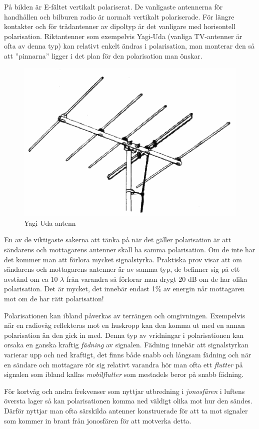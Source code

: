 På bilden är E-fältet vertikalt polariserat. De vanligaste antennerna för handhållen och bilburen radio är normalt vertikalt polariserade. För längre kontakter och för trådantenner av dipoltyp är det vanligare med horisontell polarisation. Riktantenner som exempelvis Yagi-Uda (vanliga TV-antenner är ofta av denna typ) kan relativt enkelt ändras i polarisation, man monterar den så att ''pinnarna'' ligger i det plan för den polarisation man önskar.

\begin{figure}[h]
	\centering
	\includegraphics[width=.4\textwidth]{img/yagi-uda}	
	\caption{Yagi-Uda antenn}
\end{figure}

En av de viktigaste sakerna att tänka på när det gäller polarisation är att sändarens och mottagarens antenner skall ha samma polarisation. Om de inte har det kommer man att förlora mycket signalstyrka. Praktiska prov visar att om sändarens och mottagarens antenner är av samma typ, de befinner sig på ett avstånd om ca 10 $\lambda$ från varandra så förlorar man drygt 20 dB om de har olika polarisation. Det är mycket, det innebär endast 1\% av energin når mottagaren mot om de har rätt polarisation!

Polarisationen kan ibland påverkas av terrängen och omgivningen. Exempelvis när en radiovåg reflekteras mot en huskropp kan den komma ut med en annan polarisation än den gick in med. Denna typ av vridningar i polarisationen kan orsaka en ganska kraftig \textit{fädning} av signalen. Fädning innebär att signalstyrkan varierar upp och ned kraftigt, det finns både snabb och långsam fädning och när en sändare och mottagare rör sig relativt varandra hör man ofta ett \textit{flutter} på signalen som ibland kallas \textit{mobilflutter} som mestadels beror på snabb fädning.

För kortvåg och andra frekvenser som nyttjar utbredning i \textit{jonosfären} i luftens översta lager så kan polarisationen komma ned väldigt olika mot hur den sändes. Därför nyttjar man ofta särskilda antenner konstruerade för att ta mot signaler som kommer in brant från jonosfären för att motverka detta.

